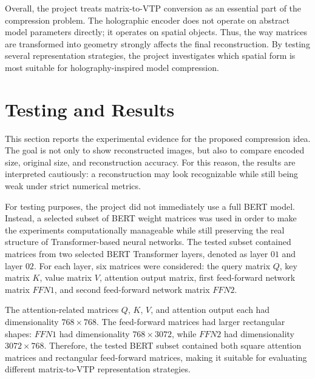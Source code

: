 \documentclass{article}
\begin{document}
\begin{normalsize}
Overall, the project treats matrix-to-VTP conversion as an essential part of the compression problem. The holographic encoder does not operate on abstract model parameters directly; it operates on spatial objects. Thus, the way matrices are transformed into geometry strongly affects the final reconstruction. By testing several representation strategies, the project investigates which spatial form is most suitable for holography-inspired model compression.

\section{Testing and Results}

This section reports the experimental evidence for the proposed compression idea. The goal is not only to show reconstructed images, but also to compare encoded size, original size, and reconstruction accuracy. For this reason, the results are interpreted cautiously: a reconstruction may look recognizable while still being weak under strict numerical metrics.


For testing purposes, the project did not immediately use a full BERT model. Instead, a selected subset of BERT weight matrices was used in order to make the experiments computationally manageable while still preserving the real structure of Transformer-based neural networks. The tested subset contained matrices from two selected BERT Transformer layers, denoted as layer \(01\) and layer \(02\). For each layer, six matrices were considered: the query matrix \(Q\), key matrix \(K\), value matrix \(V\), attention output matrix, first feed-forward network matrix \(FFN1\), and second feed-forward network matrix \(FFN2\).

The attention-related matrices \(Q\), \(K\), \(V\), and attention output each had dimensionality \(768 \times 768\). The feed-forward matrices had larger rectangular shapes: \(FFN1\) had dimensionality \(768 \times 3072\), while \(FFN2\) had dimensionality \(3072 \times 768\). Therefore, the tested BERT subset contained both square attention matrices and rectangular feed-forward matrices, making it suitable for evaluating different matrix-to-VTP representation strategies.


\end{normalsize}
\end{document}
